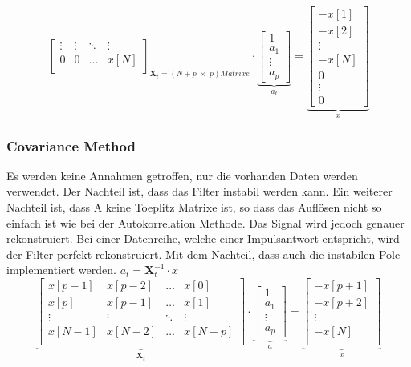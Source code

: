 \begin{aufzaehlung}
$${\begin{bmatrix}
    		\vdots & \vdots & \ddots & \vdots \\                     
    		0 & 0 & \hdots & x[N] \\
		\end{bmatrix}  }_{\bm X_t=(N+p \; \times \; p) Matrixe} \cdot \underbrace{\begin{bmatrix}
    		1 \\
    		a_1 \\
    		\vdots \\
    		a_p
		\end{bmatrix}  }_{a_t}= \underbrace{\begin{bmatrix}
    		 -x [1]\\            
    		 -x [2]\\
    		\vdots \\
    		 -x [N]\\
    		0 \\
    		\vdots \\
    		0
		\end{bmatrix}}_{x} 
		 $$ \normalsize
	\end{aufzaehlung}
	
\subsubsection{Covariance Method  }
Es werden keine Annahmen getroffen, nur die vorhanden Daten werden verwendet. Der Nachteil ist, dass das Filter instabil werden kann. 
Ein weiterer Nachteil ist, dass A keine Toeplitz Matrixe ist, so dass das Auflösen nicht so einfach ist wie bei der Autokorrelation Methode. 
Das Signal wird jedoch genauer rekonstruiert. Bei einer Datenreihe, welche einer Impulsantwort entspricht, wird der Filter perfekt rekonstruiert. 
Mit dem Nachteil, dass auch die instabilen Pole implementiert werden. $ a_t= \bm X_t^{-1}\cdot x$  \small
		$$
		\underbrace{\begin{bmatrix}               
    		x[p-1] & x[p-2] & \hdots & x[0] \\                                   
    		x[p] & x[p-1] & \hdots & x[1] \\      
    		\vdots & \vdots & \ddots & \vdots \\                        
    		x[N-1] & x[N-2] & \hdots & x[N-p] \\ 
		\end{bmatrix}  }_{\bm X_t} \cdot \underbrace{\begin{bmatrix}
    		1 \\
    		a_1 \\
    		\vdots \\
    		a_p
		\end{bmatrix}  }_{a}= \underbrace{\begin{bmatrix}
    		 -x[p+1]\\            
    		 -x[p+2]\\
    		\vdots \\
    		 -x[N]\\
		\end{bmatrix}}_{x} 
		 $$ \normalsize
\vspace{-0.5cm}

